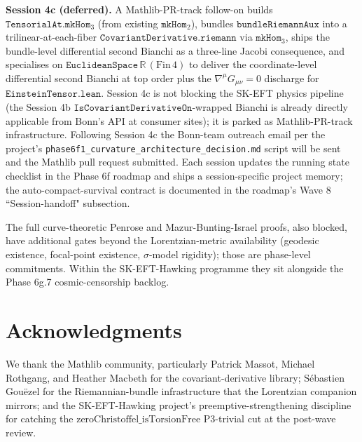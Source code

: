 \documentclass[twocolumn]{revtex4-2}
\begin{document}
\textbf{Session 4c (deferred).} A Mathlib-PR-track follow-on builds
$\texttt{TensorialAt.mkHom}_{3}$ (from existing
$\texttt{mkHom}_{2}$), bundles $\mathtt{bundleRiemannAux}$ into a
trilinear-at-each-fiber $\texttt{CovariantDerivative.riemann}$ via
$\texttt{mkHom}_{3}$, ships the bundle-level differential second
Bianchi as a three-line Jacobi consequence, and specialises on
$\texttt{EuclideanSpace}\,\mathbb{R}\,(\mathrm{Fin}\,4)$ to deliver
the coordinate-level differential second Bianchi at top order plus
the $\nabla^{\mu}G_{\mu\nu} = 0$ discharge for
$\texttt{EinsteinTensor.lean}$. Session 4c is not blocking the
SK-EFT physics pipeline (the Session 4b
$\texttt{IsCovariantDerivativeOn}$-wrapped Bianchi is already
directly applicable from Bonn's API at consumer sites); it is
parked as Mathlib-PR-track infrastructure. Following Session 4c the
Bonn-team outreach email per the project's
\texttt{phase6f1\_curvature\_architecture\_decision.md} script will
be sent and the Mathlib pull request submitted. Each session updates the running
state checklist in the Phase 6f roadmap and ships a session-specific
project memory; the auto-compact-survival contract is documented in
the roadmap's Wave 8 ``Session-handoff" subsection.

The full curve-theoretic Penrose and Mazur-Bunting-Israel proofs,
also blocked, have additional gates beyond the Lorentzian-metric
availability (geodesic existence, focal-point existence,
$\sigma$-model rigidity); those are phase-level commitments. Within
the SK-EFT-Hawking programme they sit alongside the Phase 6g.7
cosmic-censorship backlog.

\section*{Acknowledgments}
We thank the Mathlib community, particularly Patrick Massot, Michael
Rothgang, and Heather Macbeth for the covariant-derivative library;
S\'ebastien Gou\"ezel for the Riemannian-bundle infrastructure that
the Lorentzian companion mirrors; and the SK-EFT-Hawking project's
preemptive-strengthening discipline for catching the
$\mathrm{zeroChristoffel\_isTorsionFree}$ P3-trivial cut at the
post-wave review.
\end{document}
